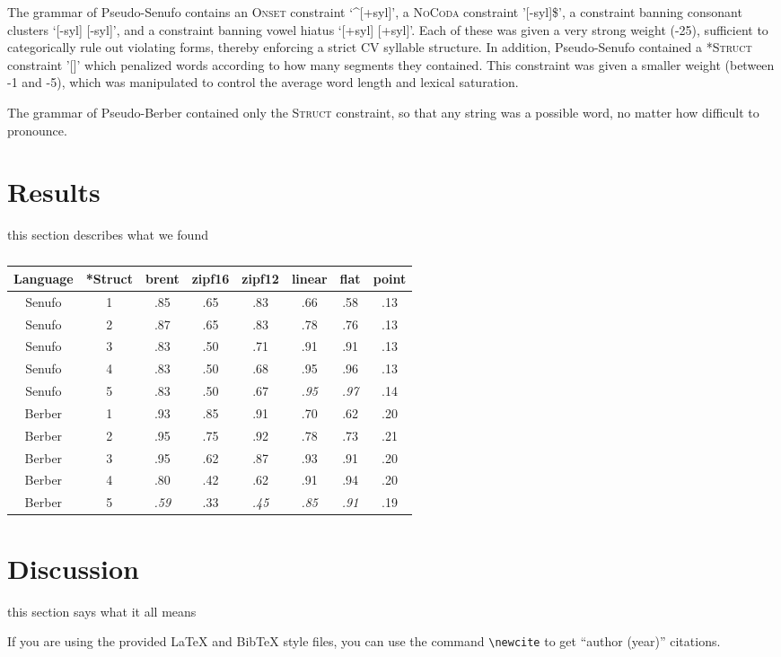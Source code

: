 \documentclass[11pt]{article}
\begin{document}
The grammar of Pseudo-Senufo contains an \textsc{Onset} constraint `^[+syl]', a \textsc{NoCoda} constraint '[-syl]\$', a constraint banning consonant clusters `[-syl] [-syl]', and a constraint banning vowel hiatus `[+syl] [+syl]'. Each of these was given a very strong weight (-25), sufficient to categorically rule out violating forms, thereby enforcing a strict CV syllable structure. In addition, Pseudo-Senufo contained a \textsc{*Struct} constraint '[]' which penalized words according to how many segments they contained. This constraint was given a smaller weight (between -1 and -5), which was manipulated to control the average word length and lexical saturation.

The grammar of Pseudo-Berber contained only the \textsc{Struct} constraint, so that any string was a possible word, no matter how difficult to pronounce.

\section{Results}

this section describes what we found
\begin{table*}[t!]
\begin{center}
\begin{tabular}{|c||c|cccccc|}
  \hline
  Language & *Struct & brent & zipf16 & zipf12 & linear & flat & point \\
  \hline
  Senufo & 1 & .85 & .65 & .83 & .66 & .58 & .13 \\
  Senufo & 2 & .87 & .65 & .83 & .78 & .76 & .13 \\
  Senufo & 3 & .83 & .50 & .71 & .91 & .91 & .13 \\
  Senufo & 4 & .83 & .50 & .68 & .95 & .96 & .13 \\
  Senufo & 5 & .83 & .50 & .67 & \textit{.95} & \textit{.97} & .14 \\
  \hline
  Berber & 1 & .93 & .85 & .91 & .70 & .62 & .20 \\
  Berber & 2 & .95 & .75 & .92 & .78 & .73 & .21 \\
  Berber & 3 & .95 & .62 & .87 & .93 & .91 & .20 \\
  Berber & 4 & .80 & .42 & .62 & .91 & .94 & .20 \\
  Berber & 5 & \textit{.59} & .33 & \textit{.45} & \textit{.85} & \textit{.91} & .19 \\
  \hline
\end{tabular}
\end{center}
\caption{\label{Results.}}
\end{table*}

\section{Discussion}

this section says what it all means

If you are using the provided \LaTeX{} and Bib\TeX{} style files, you
can use the command \verb|\newcite| to get ``author (year)'' citations.




\end{document}
